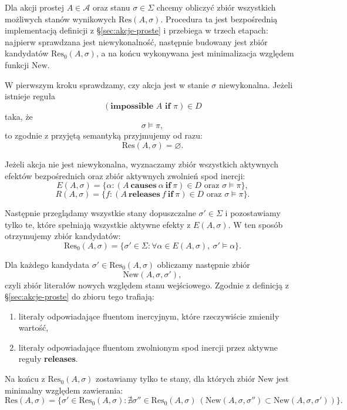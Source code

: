 \documentclass[11pt,a4paper]{article}
\theoremstyle{definition}
\begin{document}
Dla akcji prostej $A \in \mathcal{A}$ oraz stanu $\sigma \in \Sigma$ chcemy obliczyć zbiór wszystkich możliwych stanów wynikowych $\mathrm{Res}(A,\sigma)$. Procedura ta jest bezpośrednią implementacją definicji z §\ref{sec:akcje-proste} i przebiega w trzech etapach: najpierw sprawdzana jest niewykonalność, następnie budowany jest zbiór kandydatów $\mathrm{Res}_0(A,\sigma)$, a na końcu wykonywana jest minimalizacja względem funkcji $\mathrm{New}$.

W pierwszym kroku sprawdzamy, czy akcja jest w stanie $\sigma$ niewykonalna. Jeżeli istnieje reguła
\[
(\textbf{impossible } A \textbf{ if } \pi)\in D
\]
taka, że
\[
\sigma \models \pi,
\]
to zgodnie z przyjętą semantyką przyjmujemy od razu:
\[
\mathrm{Res}(A,\sigma)=\varnothing.
\]

Jeżeli akcja nie jest niewykonalna, wyznaczamy zbiór wszystkich aktywnych efektów bezpośrednich oraz zbiór aktywnych zwolnień spod inercji:
\[
E(A,\sigma)=\{\alpha : (A \ \textbf{causes} \ \alpha \ \textbf{if} \ \pi)\in D \text{ oraz } \sigma \models \pi\},
\]
\[
R(A,\sigma)=\{f : (A \ \textbf{releases} \ f \ \textbf{if} \ \pi)\in D \text{ oraz } \sigma \models \pi\}.
\]

Następnie przeglądamy wszystkie stany dopuszczalne $\sigma' \in \Sigma$ i pozostawiamy tylko te, które spełniają wszystkie aktywne efekty z $E(A,\sigma)$. W ten sposób otrzymujemy zbiór kandydatów:
\[
\mathrm{Res}_0(A,\sigma)=\{\sigma' \in \Sigma : \forall \alpha \in E(A,\sigma),\ \sigma' \models \alpha\}.
\]

Dla każdego kandydata $\sigma' \in \mathrm{Res}_0(A,\sigma)$ obliczamy następnie zbiór
\[
\mathrm{New}(A,\sigma,\sigma'),
\]
czyli zbiór literałów nowych względem stanu wejściowego. Zgodnie z definicją z §\ref{sec:akcje-proste} do zbioru tego trafiają:
\begin{enumerate}
    \item literały odpowiadające fluentom inercyjnym, które rzeczywiście zmieniły wartość,
    \item literały odpowiadające fluentom zwolnionym spod inercji przez aktywne reguły \textbf{releases}.
\end{enumerate}

Na końcu z $\mathrm{Res}_0(A,\sigma)$ zostawiamy tylko te stany, dla których zbiór $\mathrm{New}$ jest minimalny względem zawierania:
\[
\mathrm{Res}(A,\sigma)=
\{\sigma' \in \mathrm{Res}_0(A,\sigma) :
\nexists \sigma'' \in \mathrm{Res}_0(A,\sigma)\ 
(\mathrm{New}(A,\sigma,\sigma'') \subset \mathrm{New}(A,\sigma,\sigma'))\}.
\]
\end{document}

